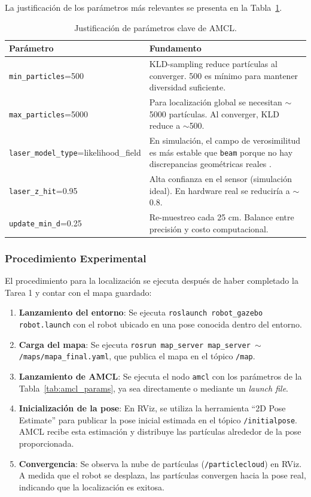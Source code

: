 \documentclass[12pt,letterpaper]{article}
\begin{document}
La justificación de los parámetros más relevantes se presenta en la Tabla~\ref{tab:amcl_just}.

\begin{table}[H]
    \centering
    \caption{Justificación de parámetros clave de AMCL.}
    \label{tab:amcl_just}
    \begin{tabular}{lp{8cm}}
        \hline
        \textbf{Parámetro} & \textbf{Fundamento} \\
        \hline
        \texttt{min\_particles}=500 & KLD-sampling reduce partículas al converger. 500 es mínimo para mantener diversidad suficiente. \\
        \texttt{max\_particles}=5000 & Para localización global se necesitan $\sim$5000 partículas. Al converger, KLD reduce a $\sim$500. \\
        \texttt{laser\_model\_type}=likelihood\_field & En simulación, el campo de verosimilitud es más estable que \texttt{beam} porque no hay discrepancias geométricas reales \citep{fox2003adapting}. \\
        \texttt{laser\_z\_hit}=0.95 & Alta confianza en el sensor (simulación ideal). En hardware real se reduciría a $\sim$0.8. \\
        \texttt{update\_min\_d}=0.25 & Re-muestreo cada 25 cm. Balance entre precisión y costo computacional. \\
        \hline
    \end{tabular}
\end{table}

\subsubsection{Procedimiento Experimental}

El procedimiento para la localización se ejecuta después de haber completado la Tarea 1 y contar con el mapa guardado:

\begin{enumerate}
    \item \textbf{Lanzamiento del entorno}: Se ejecuta \texttt{roslaunch robot\_gazebo robot.launch} con el robot ubicado en una pose conocida dentro del entorno.
    \item \textbf{Carga del mapa}: Se ejecuta \texttt{rosrun map\_server map\_server $\sim$/maps/mapa\_final.yaml}, que publica el mapa en el tópico \texttt{/map}.
    \item \textbf{Lanzamiento de AMCL}: Se ejecuta el nodo \texttt{amcl} con los parámetros de la Tabla~\ref{tab:amcl_params}, ya sea directamente o mediante un \textit{launch file}.
    \item \textbf{Inicialización de la pose}: En RViz, se utiliza la herramienta ``2D Pose Estimate'' para publicar la pose inicial estimada en el tópico \texttt{/initialpose}. AMCL recibe esta estimación y distribuye las partículas alrededor de la pose proporcionada.
    \item \textbf{Convergencia}: Se observa la nube de partículas (\texttt{/particlecloud}) en RViz. A medida que el robot se desplaza, las partículas convergen hacia la pose real, indicando que la localización es exitosa.
\end{enumerate}
\end{document}
